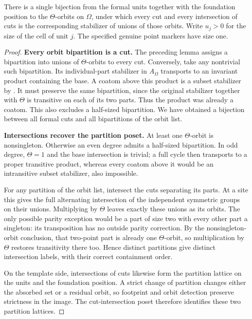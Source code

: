 \begin{proposition}\label{t:weighted-alignment}
There is a single bijection from the formal units together with the
foundation position to the \(\Theta\)-orbits on \(\Omega\), under which
every cut and every intersection of cuts is the corresponding stabilizer
of unions of those orbits.  Write \(u_j>0\) for the size of the cell of unit
\(j\).  The specified genuine point markers have size one.
\end{proposition}
\begin{proof}
\noindent\textbf{Every orbit bipartition is a cut.}
The preceding lemma assigns a bipartition into unions of
\(\Theta\)-orbits to every cut.  Conversely, take any nontrivial such
bipartition.  Its individual-part stabilizer in \(A_\Omega\)
transports to an invariant product containing the base.  A coatom
above this product is a subset stabilizer by
.  It must preserve the same bipartition, since
the original stabilizer together with \(\Theta\) is transitive on
each of its two parts.  Thus the product was already a coatom.
This also excludes a half-sized bipartition.  We have obtained a
bijection between all formal cuts and all bipartitions of the orbit list.

\noindent\textbf{Intersections recover the partition poset.}
At least one \(\Theta\)-orbit is nonsingleton.  Otherwise an even
degree admits a half-sized bipartition.  In odd degree, \(\Theta=1\)
and the base intersection is trivial; a full cycle then transports
to a proper transitive product, whereas every coatom above it would
be an intransitive subset stabilizer, also impossible.

For any partition of the orbit list, intersect the cuts separating
its parts.  At a site this gives the full alternating intersection
of the independent symmetric groups on their unions.  Multiplying
by \(\Theta\) leaves exactly these unions as its orbits.  The only
possible parity exception would be a part of size two with every
other part a singleton: its transposition has no outside parity
correction.  By the nonsingleton-orbit conclusion, that two-point
part is already one \(\Theta\)-orbit, so multiplication by
\(\Theta\) restores transitivity there too.  Hence distinct
partitions give distinct intersection labels, with their correct
containment order.

On the template side, intersections of cuts likewise form the
partition lattice on the units and the foundation position.  A
strict change of partition changes either the absorbed set or a
residual orbit, so footprint and orbit detection preserve strictness
in the image.  The cut-intersection poset therefore identifies these
two partition lattices.


\end{proof}
